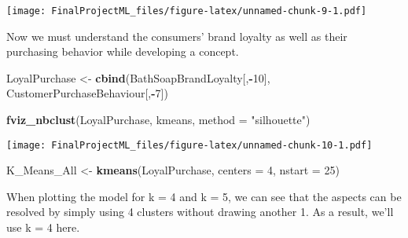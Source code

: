 \documentclass[
]{article}
\newenvironment{Shaded}{\begin{snugshade}}{\end{snugshade}}
\newcommand{\CommentTok}[1]{\textcolor[rgb]{0.56,0.35,0.01}{\textit{#1}}}
\newcommand{\DataTypeTok}[1]{\textcolor[rgb]{0.13,0.29,0.53}{#1}}
\newcommand{\DecValTok}[1]{\textcolor[rgb]{0.00,0.00,0.81}{#1}}
\newcommand{\KeywordTok}[1]{\textcolor[rgb]{0.13,0.29,0.53}{\textbf{#1}}}
\newcommand{\NormalTok}[1]{#1}
\newcommand{\OperatorTok}[1]{\textcolor[rgb]{0.81,0.36,0.00}{\textbf{#1}}}
\newcommand{\StringTok}[1]{\textcolor[rgb]{0.31,0.60,0.02}{#1}}
\begin{document}
\begin{Shaded}
\end{Shaded}

\texttt{[image: FinalProjectML\_files/figure-latex/unnamed-chunk-9-1.pdf]}

Now we must understand the consumers' brand loyalty as well as their
purchasing behavior while developing a concept.

\begin{Shaded}
\begin{Highlighting}[]
\NormalTok{LoyalPurchase <-}\StringTok{ }\KeywordTok{cbind}\NormalTok{(BathSoapBrandLoyalty[,}\OperatorTok{-}\DecValTok{10}\NormalTok{], CustomerPurchaseBehaviour[,}\OperatorTok{-}\DecValTok{7}\NormalTok{])}

\KeywordTok{fviz_nbclust}\NormalTok{(LoyalPurchase, kmeans, }\DataTypeTok{method =} \StringTok{"silhouette"}\NormalTok{)}
\end{Highlighting}
\end{Shaded}

\texttt{[image: FinalProjectML\_files/figure-latex/unnamed-chunk-10-1.pdf]}

\begin{Shaded}
\begin{Highlighting}[]
\NormalTok{K_Means_All <-}\StringTok{ }\KeywordTok{kmeans}\NormalTok{(LoyalPurchase, }\DataTypeTok{centers =} \DecValTok{4}\NormalTok{, }\DataTypeTok{nstart =} \DecValTok{25}\NormalTok{)}
\end{Highlighting}
\end{Shaded}

When plotting the model for k = 4 and k = 5, we can see that the aspects
can be resolved by simply using 4 clusters without drawing another 1. As
a result, we'll use k = 4 here.
\end{document}
